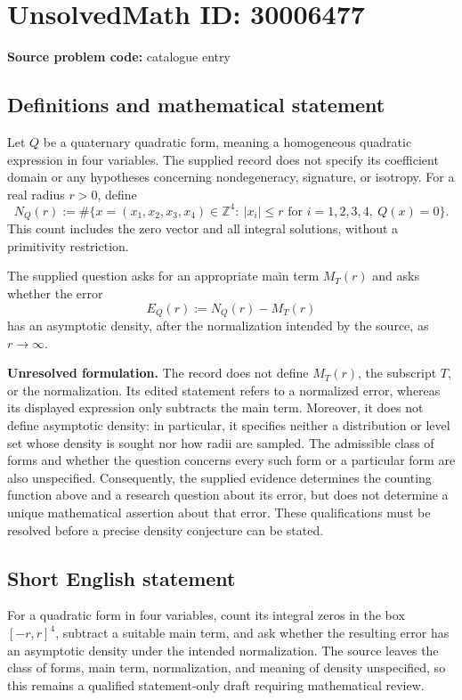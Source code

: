 \documentclass[11pt]{article}
\newcommand{\Z}{\mathbb{Z}}
\begin{document}
\section*{UnsolvedMath ID: 30006477}
\textbf{Source problem code:} catalogue entry
\subsection{Definitions and mathematical statement}
Let \(Q\) be a quaternary quadratic form, meaning a homogeneous quadratic expression in four variables. The supplied record does not specify its coefficient domain or any hypotheses concerning nondegeneracy, signature, or isotropy. For a real radius \(r>0\), define
\[
N_Q(r):=\#\bigl\{x=(x_1,x_2,x_3,x_4)\in\Z^4:\ |x_i|\le r\text{ for }i=1,2,3,4,\ Q(x)=0\bigr\}.
\]
This count includes the zero vector and all integral solutions, without a primitivity restriction.

The supplied question asks for an appropriate main term \(M_T(r)\) and asks whether the error
\[
E_Q(r):=N_Q(r)-M_T(r)
\]
has an asymptotic density, after the normalization intended by the source, as \(r\to\infty\).

\textbf{Unresolved formulation.} The record does not define \(M_T(r)\), the subscript \(T\), or the normalization. Its edited statement refers to a normalized error, whereas its displayed expression only subtracts the main term. Moreover, it does not define asymptotic density: in particular, it specifies neither a distribution or level set whose density is sought nor how radii are sampled. The admissible class of forms and whether the question concerns every such form or a particular form are also unspecified. Consequently, the supplied evidence determines the counting function above and a research question about its error, but does not determine a unique mathematical assertion about that error. These qualifications must be resolved before a precise density conjecture can be stated.
\subsection{Short English statement}
For a quadratic form in four variables, count its integral zeros in the box \([-r,r]^4\), subtract a suitable main term, and ask whether the resulting error has an asymptotic density under the intended normalization. The source leaves the class of forms, main term, normalization, and meaning of density unspecified, so this remains a qualified statement-only draft requiring mathematical review.
\end{document}
